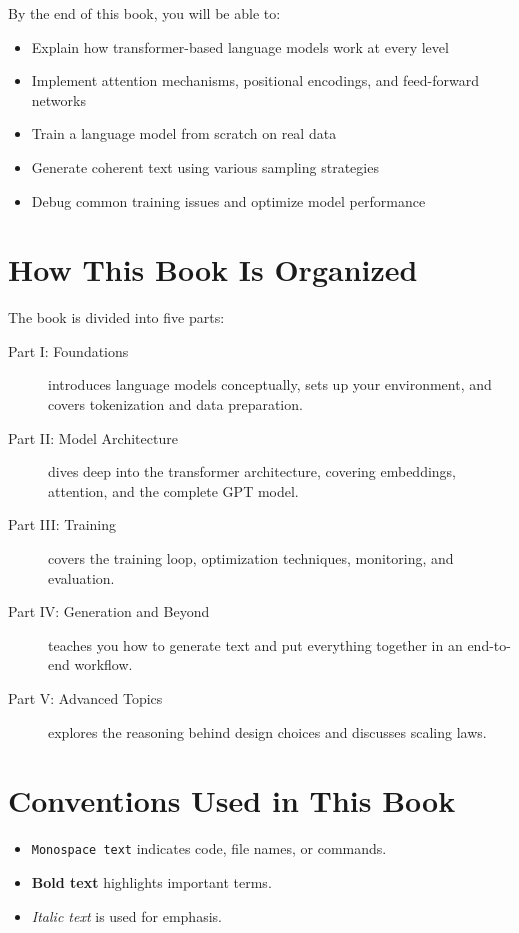 \documentclass[11pt,a4paper,openany]{book}
\begin{document}
By the end of this book, you will be able to:
\begin{itemize}
    \item Explain how transformer-based language models work at every level
    \item Implement attention mechanisms, positional encodings, and feed-forward networks
    \item Train a language model from scratch on real data
    \item Generate coherent text using various sampling strategies
    \item Debug common training issues and optimize model performance
\end{itemize}

\section*{How This Book Is Organized}

The book is divided into five parts:

\begin{description}
    \item[Part I: Foundations] introduces language models conceptually, sets up your environment, and covers tokenization and data preparation.

    \item[Part II: Model Architecture] dives deep into the transformer architecture, covering embeddings, attention, and the complete GPT model.

    \item[Part III: Training] covers the training loop, optimization techniques, monitoring, and evaluation.

    \item[Part IV: Generation and Beyond] teaches you how to generate text and put everything together in an end-to-end workflow.

    \item[Part V: Advanced Topics] explores the reasoning behind design choices and discusses scaling laws.
\end{description}

\section*{Conventions Used in This Book}

\begin{itemize}
    \item \texttt{Monospace text} indicates code, file names, or commands.
    \item \textbf{Bold text} highlights important terms.
    \item \textit{Italic text} is used for emphasis.
\end{itemize}
\end{document}
